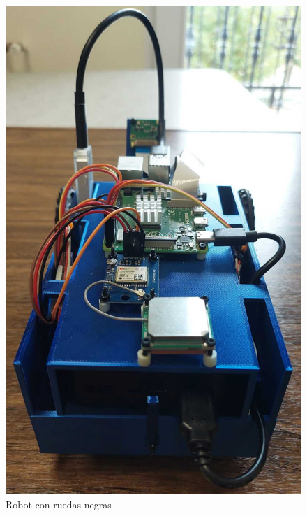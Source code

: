 \begin{figure}[ht!]
	\centering
	\begin{minipage}{0.31\linewidth}
		\centering
		\includegraphics[width=\linewidth]{figs/cap5/ab.jpeg}
		\caption*{\centering Robot con ruedas negras}
	\end{minipage}
	\hspace{2cm}
	\begin{minipage}{0.30\linewidth}
		\centering

\end{minipage}
\end{figure}

